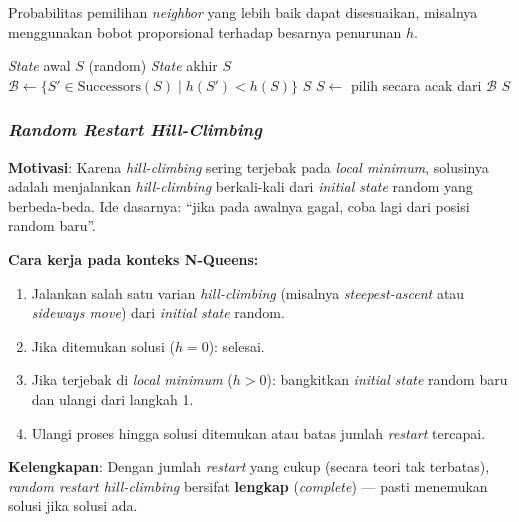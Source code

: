 \documentclass[12pt,a4paper]{article}
\begin{document}
Probabilitas pemilihan \textit{neighbor} yang lebih baik dapat disesuaikan, misalnya menggunakan bobot proporsional terhadap besarnya penurunan $h$.

\begin{algorithm}[H]
\caption{\textit{Stochastic Hill-Climbing} untuk N-Queens}
\label{alg:stochastic-hc}
\begin{algorithmic}[1]
\Require \textit{State} awal $S$ (random)
\Ensure \textit{State} akhir $S$
\Repeat
    \State $\mathcal{B} \leftarrow \{ S' \in \text{Successors}(S) \mid h(S') < h(S) \}$
        \State \Return $S$ 
    \EndIf
    \State $S \leftarrow$ pilih secara acak dari $\mathcal{B}$
\State \Return $S$
\end{algorithmic}
\end{algorithm}

\subsubsection{\textit{Random Restart Hill-Climbing}}
\label{subsubsec:random-restart}

\textbf{Motivasi}: Karena \textit{hill-climbing} sering terjebak pada \textit{local minimum}, solusinya adalah menjalankan \textit{hill-climbing} berkali-kali dari \textit{initial state} random yang berbeda-beda. Ide dasarnya: ``jika pada awalnya gagal, coba lagi dari posisi random baru''.

\textbf{Cara kerja pada konteks N-Queens:}
\begin{enumerate}[label=\arabic*.]
    \item Jalankan salah satu varian \textit{hill-climbing} (misalnya \textit{steepest-ascent} atau \textit{sideways move}) dari \textit{initial state} random.
    \item Jika ditemukan solusi ($h = 0$): selesai.
    \item Jika terjebak di \textit{local minimum} ($h > 0$): bangkitkan \textit{initial state} random baru dan ulangi dari langkah 1.
    \item Ulangi proses hingga solusi ditemukan atau batas jumlah \textit{restart} tercapai.
\end{enumerate}

\textbf{Kelengkapan}: Dengan jumlah \textit{restart} yang cukup (secara teori tak terbatas), \textit{random restart hill-climbing} bersifat \textbf{lengkap} (\textit{complete}) --- pasti menemukan solusi jika solusi ada.
\end{document}
